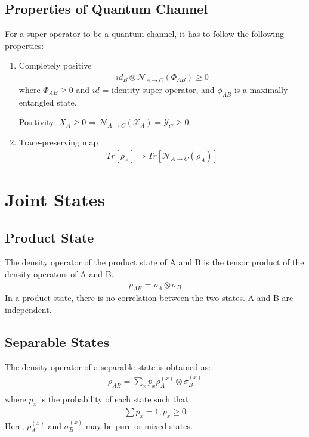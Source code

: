 \documentclass{article}
\begin{document}
\subsection{Properties of Quantum Channel}
For a super operator to be a quantum channel, it has to follow the following properties:
\begin{enumerate}
	\item Completely positive
	      \begin{gather*}
	      	id_{B} \otimes \mathcal{N}_{A \rightarrow{} C} (\Phi_{AB}) \geq 0
	      \end{gather*}
	      where $\Phi _{AB}\geq 0$ and $id$ = identity super operator, and $\phi_{AB}$ is a maximally entangled state.
	      
	      \subitem Positivity:
	      $X_{A} \geq 0 \Rightarrow{} \mathcal{N}_{A\rightarrow{} C} (\mathcal{X}_{A}) = \mathcal{Y}_{C} \geq 0$
	      
	\item Trace-preserving map
	      \begin{gather*}
	      	Tr[\rho_{A}] \Rightarrow{} Tr[\mathcal{N}_{A \rightarrow C} (\rho _{A})]
	      \end{gather*}
\end{enumerate}

\section{Joint States}
\subsection{Product State}
The density operator of the product state of A and B is the tensor product of the density operators of A and B.
\begin{gather*}
	\rho _{AB} = \rho _{A} \otimes \sigma _{B}
\end{gather*}
In a product state, there is no correlation between the two states. A and B are independent.

\subsection{Separable States}
The density operator of a separable state is obtained as:
\begin{gather*}
	\rho _{AB} =  \sum_{x} p_{x} \rho ^{(x)} _{A} \otimes \sigma ^{(x)} _{B}  \\
\end{gather*}
where $p _{x}$ is the probability of each state such that
\begin{gather*}
	\sum p_{x} = 1,   p_{x} \geq 0
\end{gather*}
Here, $\rho ^{(x)} _{A} $ and $\sigma ^{(x)} _{B}$ may be pure or mixed states.
\end{document}
